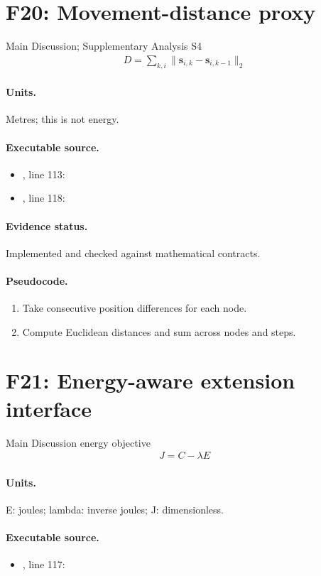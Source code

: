 \documentclass[10pt]{article}
\begin{document}
\section*{F20: Movement-distance proxy}
Main Discussion; Supplementary Analysis S4
\begin{gather*}D=\sum_{k,i}\|\mathbf s_{i,k}-\mathbf s_{i,k-1}\|_2\end{gather*}
\paragraph{Units.} Metres; this is not energy.
\paragraph{Executable source.}
\begin{itemize}[leftmargin=*]
\item {}, line 113: 
\item {}, line 118: 
\end{itemize}
\paragraph{Evidence status.} Implemented and checked against mathematical contracts.
\paragraph{Pseudocode.}
\begin{enumerate}[leftmargin=*]
\item Take consecutive position differences for each node.
\item Compute Euclidean distances and sum across nodes and steps.
\end{enumerate}
\newpage
\section*{F21: Energy-aware extension interface}
Main Discussion energy objective
\begin{gather*}J=C-\lambda E\end{gather*}
\paragraph{Units.} E: joules; lambda: inverse joules; J: dimensionless.
\paragraph{Executable source.}
\begin{itemize}[leftmargin=*]
\item {}, line 117: 
\end{itemize}
\end{document}
